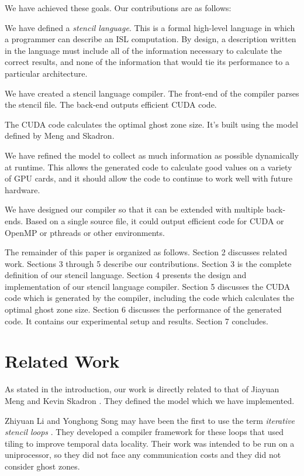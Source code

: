 \documentclass{styles/sig-alternate}
\begin{document}
We have achieved these goals.  Our contributions are as follows:
\begin{itemize*}
\item We have defined a {\em stencil language}.  This is a formal
  high-level language in which a programmer can describe an ISL
  computation.  By design, a description written in the language must
  include all of the information necessary to calculate the correct
  results, and none of the information that would tie its performance
  to a particular architecture.
\item We have created a stencil language compiler.  The front-end of
  the compiler parses the stencil file.  The back-end outputs
  efficient CUDA code.
\item The CUDA code calculates the optimal ghost zone size.  It's
  built using the model defined by Meng and Skadron.
\item We have refined the model to collect as much information as
  possible dynamically at runtime.  This allows the generated code to
  calculate good values on a variety of GPU cards, and it should allow
  the code to continue to work well with future hardware.
\item We have designed our compiler so that it can be extended with
  multiple back-ends.  Based on a single source file, it could output
  efficient code for CUDA or OpenMP or pthreads or other environments.
\end{itemize*}

The remainder of this paper is organized as follows.  Section 2
discusses related work.  Sections 3 through 5 describe our
contributions.  Section 3 is the complete definition of our stencil
language.  Section 4 presents the design and implementation of our
stencil language compiler.  Section 5 discusses the CUDA code which is
generated by the compiler, including the code which calculates the
optimal ghost zone size.  Section 6 discusses the performance of the
generated code.  It contains our experimental setup and results.
Section 7 concludes.

\section{Related Work}

As stated in the introduction, our work is directly related to that of
Jiayuan Meng and Kevin Skadron \cite{meng}.  They defined the model
which we have implemented.

Zhiyuan Li and Yonghong Song may have been the first to use the term
{\em iterative stencil loops} \cite{li}.  They developed a compiler
framework for these loops that used tiling to improve temporal data
locality.  Their work was intended to be run on a uniprocessor, so
they did not face any communication costs and they did not consider
ghost zones.
\end{document}
